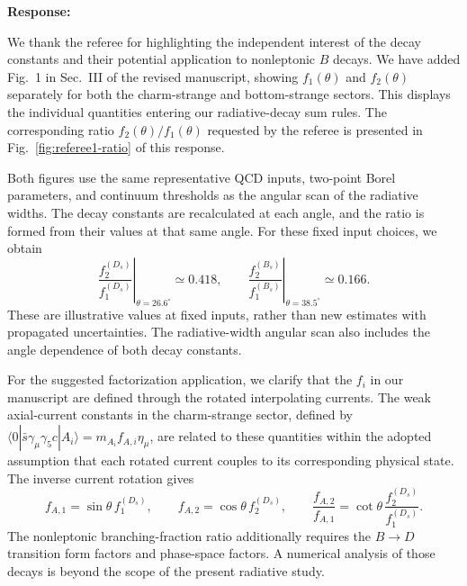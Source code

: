 
\noindent\textbf{Response:}

We thank the referee for highlighting the independent interest of the
decay constants and their potential application to nonleptonic $B$ decays.
We have added Fig.~1 in Sec.~III of the revised manuscript, showing
$f_1(\theta)$ and $f_2(\theta)$ separately for both the charm-strange
and bottom-strange sectors. This displays the individual quantities
entering our radiative-decay sum rules. The corresponding ratio
$f_2(\theta)/f_1(\theta)$ requested by the referee is presented in
Fig.~\ref{fig:referee1-ratio} of this response.

Both figures use the same representative QCD inputs, two-point Borel
parameters, and continuum thresholds as the angular scan of the radiative
widths. The decay constants are recalculated at each angle, and the ratio
is formed from their values at that same angle. For these fixed input
choices, we obtain
\begin{equation}
\left.\frac{f_2^{(D_s)}}{f_1^{(D_s)}}\right|_{\theta=26.6^\circ}
\simeq0.418,
\qquad
\left.\frac{f_2^{(B_s)}}{f_1^{(B_s)}}\right|_{\theta=38.5^\circ}
\simeq0.166.
\end{equation}
These are illustrative values at fixed inputs, rather than new estimates
with propagated uncertainties. The radiative-width angular scan also
includes the angle dependence of both decay constants.

For the suggested factorization application, we clarify that the $f_i$
in our manuscript are defined through the rotated interpolating currents.
The weak axial-current constants in the charm-strange sector, defined by
$\langle0|\bar s\gamma_\mu\gamma_5 c|A_i\rangle
=m_{A_i}f_{A,i}\eta_\mu$, are related to these quantities within the
adopted assumption that each rotated current couples to its corresponding
physical state. The inverse current rotation gives
\begin{equation}
f_{A,1}=\sin\theta\,f_1^{(D_s)},\qquad
f_{A,2}=\cos\theta\,f_2^{(D_s)},\qquad
\frac{f_{A,2}}{f_{A,1}}=\cot\theta\,
\frac{f_2^{(D_s)}}{f_1^{(D_s)}}.
\end{equation}
The nonleptonic branching-fraction ratio additionally requires the
$B\to D$ transition form factors and phase-space factors. A numerical
analysis of those decays is beyond the scope of the present radiative
study.

